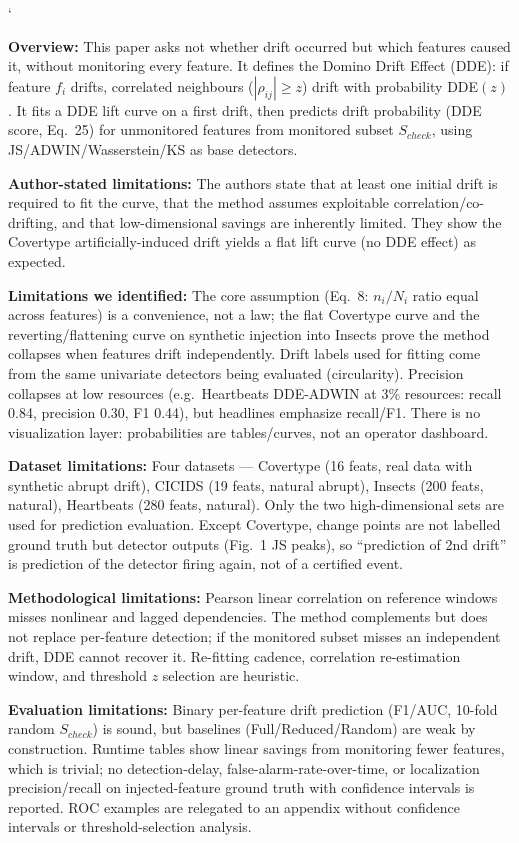 `\documentclass[10pt]{article}
\newcommand{\sumitem}[2]{\noindent\textbf{#1:} #2\par}
\begin{document}
\sumitem{Overview}{This paper asks not whether drift occurred but which features caused it, without monitoring every feature. It defines the Domino Drift Effect (DDE): if feature $f_i$ drifts, correlated neighbours ($|\rho_{ij}| \geq z$) drift with probability DDE$(z)$. It fits a DDE lift curve on a first drift, then predicts drift probability (DDE score, Eq.\ 25) for unmonitored features from monitored subset $S_{check}$, using JS/ADWIN/Wasserstein/KS as base detectors.}

\sumitem{Author-stated limitations}{The authors state that at least one initial drift is required to fit the curve, that the method assumes exploitable correlation/co-drifting, and that low-dimensional savings are inherently limited. They show the Covertype artificially-induced drift yields a flat lift curve (no DDE effect) as expected.}

\sumitem{Limitations we identified}{The core assumption (Eq.\ 8: $n_i/N_i$ ratio equal across features) is a convenience, not a law; the flat Covertype curve and the reverting/flattening curve on synthetic injection into Insects prove the method collapses when features drift independently. Drift labels used for fitting come from the same univariate detectors being evaluated (circularity). Precision collapses at low resources (e.g.\ Heartbeats DDE-ADWIN at 3\% resources: recall 0.84, precision 0.30, F1 0.44), but headlines emphasize recall/F1. There is no visualization layer: probabilities are tables/curves, not an operator dashboard.}

\sumitem{Dataset limitations}{Four datasets --- Covertype (16 feats, real data with synthetic abrupt drift), CICIDS (19 feats, natural abrupt), Insects (200 feats, natural), Heartbeats (280 feats, natural). Only the two high-dimensional sets are used for prediction evaluation. Except Covertype, change points are not labelled ground truth but detector outputs (Fig.\ 1 JS peaks), so ``prediction of 2nd drift'' is prediction of the detector firing again, not of a certified event.}

\sumitem{Methodological limitations}{Pearson linear correlation on reference windows misses nonlinear and lagged dependencies. The method complements but does not replace per-feature detection; if the monitored subset misses an independent drift, DDE cannot recover it. Re-fitting cadence, correlation re-estimation window, and threshold $z$ selection are heuristic.}

\sumitem{Evaluation limitations}{Binary per-feature drift prediction (F1/AUC, 10-fold random $S_{check}$) is sound, but baselines (Full/Reduced/Random) are weak by construction. Runtime tables show linear savings from monitoring fewer features, which is trivial; no detection-delay, false-alarm-rate-over-time, or localization precision/recall on injected-feature ground truth with confidence intervals is reported. ROC examples are relegated to an appendix without confidence intervals or threshold-selection analysis.}
\end{document}
